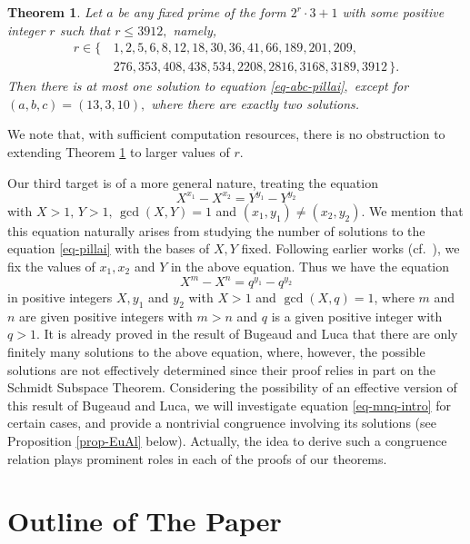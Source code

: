 \documentclass[11pt]{amsart}
\newtheorem{thm}{Theorem}%
\numberwithin{equation}{section}
\begin{document}
\begin{thm}\label{th-atmost1P-a97etc}
Let $a$ be any fixed prime of the form $2^r \cdot 3+1$ with some positive integer $r$ such that $r \le 3912,$ namely, 
\begin{align*}\label{excep-set}
r \in \{ \,&1, 2, 5, 6, 8, 12, 18, 30, 36, 41, 66,189, 201, 209, \\
&276, 353, 408, 438, 534, 2208, 2816,3168, 3189, 3912\,\}.
\end{align*}
Then there is at most one solution to equation \eqref{eq-abc-pillai}$,$ except for $(a,b,c)=(13,3,10),$ where there are exactly two solutions.
\end{thm}
%
We note that, with sufficient computation resources, there is no obstruction to extending Theorem \ref{th-atmost1P-a97etc} to larger values of $r$.

Our third target is of a more general nature, treating the equation 
\[
X^{x_1} - X^{x_2} = Y^{y_1} - Y^{y_2}
\]
with $X>1,\,Y>1,\,\gcd(X,Y)=1$ and $(x_1, y_1) \ne (x_2, y_2)$.  
We mention that this equation naturally arises from studying the number of solutions to the equation \eqref{eq-pillai} with the bases of $X,Y$ fixed. 
Following earlier works (cf.~\cite{Lu, BuLu}), we fix the values of $x_1,x_2$ and $Y$ in the above equation.
Thus we have the equation
\begin{equation} \label{eq-mnq-intro}
X^m - X^n = q^{y_1} - q^{y_2}
\end{equation}
in positive integers $X,y_1$ and $y_2$ with $X>1$ and $\gcd(X,q)=1$, where $m$ and $n$ are given positive integers with $m>n$ and $q$ is a given positive integer with $q>1$.
It is already proved in the result of Bugeaud and Luca \cite[Theorem 4.2]{BuLu} that there are only finitely many solutions to the above equation, where, however, the possible solutions are not effectively determined since their proof relies in part on the Schmidt Subspace Theorem.
Considering the possibility of an effective version of this result of Bugeaud and Luca, we will investigate equation \eqref{eq-mnq-intro} for certain cases, and provide a nontrivial congruence involving its solutions (see Proposition \ref{prop-EuAl} below).
Actually, the idea to derive such a congruence relation plays prominent roles in each of the proofs of our theorems.

\section{Outline of The Paper} \label{sec-222}
\end{document}
